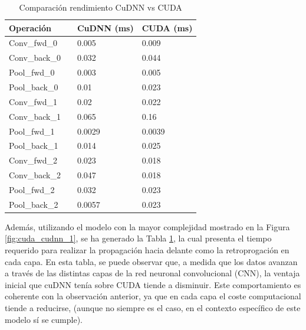 \begin{table}[H]
	\centering
	\begin{tabular}{llll}
		Operación 	 &\vline  & CuDNN (ms) & CUDA (ms)  \\
		\hline
		
		Conv\_fwd\_0    & \vline & 0.005	 &	0.009 \\			
		Conv\_back\_0   & \vline & 	0.032 &	0.044 \\
		\hline
		Pool\_fwd\_0 	 & \vline & 0.003	 &	0.005 \\
		Pool\_back\_0 	 & \vline & 0.01    &	0.023 \\
		\hline
		\hline
		\hline
		Conv\_fwd\_1    & \vline & 0.02	 &	0.022	\\			
		Conv\_back\_1   & \vline & 0.065	 &	0.16	\\
		\hline
		Pool\_fwd\_1 	 & \vline & 0.0029	 &	0.0039	 \\
		Pool\_back\_1 	 & \vline  & 0.014    &	0.025	 \\
		\hline
		\hline
		\hline
		Conv\_fwd\_2    & \vline & 0.023	 &	0.018 \\			
		Conv\_back\_2   & \vline & 0.047	 &	0.018 \\
		\hline
		Pool\_fwd\_2 	 & \vline & 0.032	 &	0.023 \\
		Pool\_back\_2 	 & \vline & 0.0057    &	0.023 \\	
	\end{tabular}
	\caption{Comparación rendimiento CuDNN vs CUDA}
	\label{tabla_resultados}
\end{table}

Además, utilizando el modelo con la mayor complejidad mostrado en la Figura \ref{fig:cuda_cudnn_1}, se ha generado la Tabla \ref{tabla_resultados}, la cual presenta el tiempo requerido para realizar la propagación hacia delante como la retroprogación en cada capa.
En esta tabla, se puede observar que, a medida que los datos avanzan a través de las distintas capas de la red neuronal convolucional (CNN), la ventaja inicial que cuDNN tenía sobre CUDA tiende a disminuir. Este comportamiento es coherente con la observación anterior, ya que en cada capa el coste computacional tiende a reducirse, (aunque no siempre es el caso, en el contexto específico de este modelo sí se cumple).